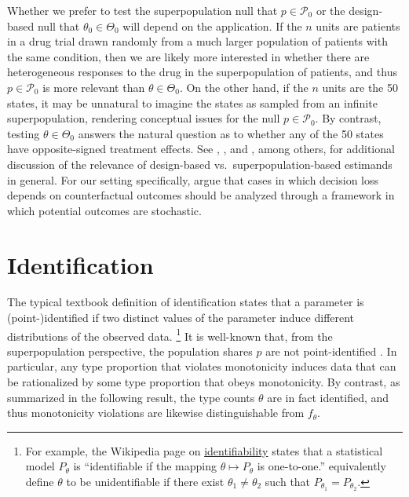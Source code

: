 \documentclass[12pt,reqno]{amsart}
\begin{document}
\begin{rem}
Whether we prefer to test the superpopulation null that $p \in \mathcal{P}_0$ or the
design-based null that $\theta_0 \in \Theta_0$ will depend on the application. If the $n$
units are patients in a drug trial drawn randomly from a much larger population of
patients with the same condition, then we are likely more interested in whether there are heterogeneous responses to the drug in the superpopulation of patients, and thus $p \in
\mathcal{P}_0$ is more relevant than $\theta \in \Theta_0$. On the other hand, if the $n$
units are the 50 states, it may be unnatural to imagine the states as sampled from an
infinite superpopulation, rendering conceptual issues for the null $p \in \mathcal{P}_0$.
By contrast, testing $\theta \in \Theta_0$ answers the natural question as to whether any
of the 50 states have opposite-signed treatment effects. See \citet{copas_randomization_1973},
\citet{reichardt_justifying_1999}, and \citet{rambachan_design-based_2025}, among others,
for additional discussion of the relevance of design-based vs.\ superpopulation-based
estimands in general.
For our setting specifically, \cite{gelman2025russian} argue that cases in which decision loss depends on counterfactual outcomes should be analyzed through a framework in which potential outcomes are stochastic.


\end{rem}




\section{Identification}

The typical textbook definition of identification states that a parameter is \mbox{(point-)}\allowbreak{}identified if two
distinct values of the parameter induce different distributions of the observed data.%
\footnote{For example, the Wikipedia page on \href{https://en.wikipedia.org/w/index.php?title=Identifiability&oldid=1292274414}{identifiability} states that a statistical model $P_\theta$ is ``identifiable if the mapping $\theta \mapsto P_\theta$ is one-to-one.'' \citet[][Definition 5.2]{lehmann_theory_1998} equivalently define $\theta$ to be unidentifiable if there exist $\theta_1 \neq \theta_2$ such that $P_{\theta_1} = P_{\theta_2}$.}
It
is well-known that, from the superpopulation perspective, the population shares $p$ are not
point-identified \citep{heckman_making_1997}. In particular, any type proportion that
violates monotonicity induces data that can be rationalized by some  type proportion
that obeys monotonicity. By contrast, as summarized in the following result, the type
counts $\theta$ are in fact identified, and thus monotonicity violations are likewise
distinguishable from $f_\theta$.
\end{document}
